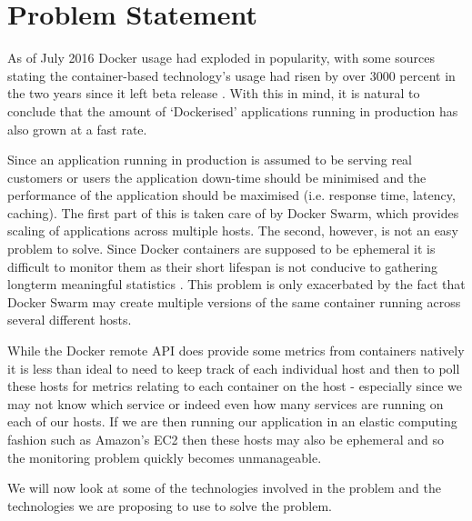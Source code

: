 \section{Problem Statement}
\label{sec:problem}
As of July 2016 Docker usage had exploded in popularity, with some sources stating the container-based technology's usage had risen by over 3000 percent in the two years since it left beta release \citep{DockerUsage2016}. With this in mind, it is natural to conclude that the amount of `Dockerised' applications running in production has also grown at a fast rate.

Since an application running in production is assumed to be serving real customers or users the application down-time should be minimised and the performance of the application should be maximised (i.e. response time, latency, caching). The first part of this is taken care of by Docker Swarm, which provides scaling of applications across multiple hosts. The second, however, is not an easy problem to solve. Since Docker containers are supposed to be ephemeral it is difficult to monitor them as their short lifespan is not conducive to gathering longterm meaningful statistics \citep{DataDog2017}. This problem is only exacerbated by the fact that Docker Swarm may create multiple versions of the same container running across several different hosts. 

While the Docker remote API does provide some metrics from containers natively it is less than ideal to need to keep track of each individual host and then to poll these hosts for metrics relating to each container on the host - especially since we may not know which service or indeed even how many services are running on each of our hosts. If we are then running our application in an elastic computing fashion such as Amazon's EC2 then these hosts may also be ephemeral and so the monitoring problem quickly becomes unmanageable.

We will now look at some of the technologies involved in the problem and the technologies we are proposing to use to solve the problem.
